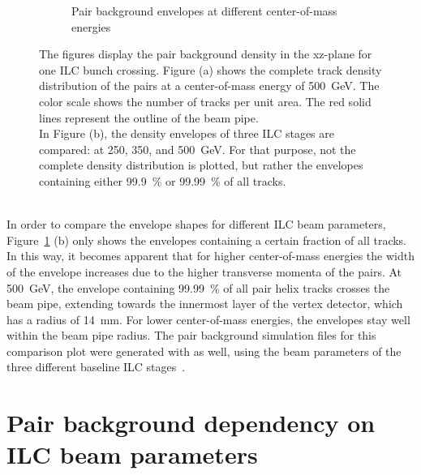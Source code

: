 \begin{figure}
\begin{subfigure}[b]{0.49\textwidth}
   \caption{Pair background envelopes at different center-of-mass energies}
   \end{subfigure}
   \caption[Pair background density]{The figures display the pair background density in the xz-plane for one ILC bunch crossing.
   Figure (a) shows the complete track density distribution of the pairs at a center-of-mass energy of \SI[detect-all]{500}{\GeV}.
   The color scale shows the number of tracks per unit area.
   The red solid lines represent the outline of the beam pipe.
   \\In Figure (b), the density envelopes of three ILC stages are compared: at 250, 350, and \SI[detect-all]{500}{\GeV}.
   For that purpose, not the complete density distribution is plotted, but rather the envelopes containing either \SI[detect-all]{99.9}{\percent} or \SI[detect-all]{99.99}{\percent} of all tracks.
   }
   \label{fig:PairBkg:Density}
 \end{figure}
\\In order to compare the envelope shapes for different ILC beam parameters, Figure~\ref{fig:PairBkg:Density} (b) only shows the envelopes containing a certain fraction of all tracks.
In this way, it becomes apparent that for higher center-of-mass energies the width of the envelope increases due to the higher transverse momenta of the pairs.
At \SI{500}{\GeV}, the envelope containing \SI{99.99}{\percent} of all pair helix tracks crosses the beam pipe, extending towards the innermost layer of the \sid vertex detector, which has a radius of \SI{14}{\milli\meter}.
For lower center-of-mass energies, the envelopes stay well within the beam pipe radius.
The pair background simulation files for this comparison plot were generated with \guineapig as well, using the beam parameters of the three different baseline ILC stages~\cite[p. 11]{TDR1}.

\section{Pair background dependency on ILC beam parameters}
